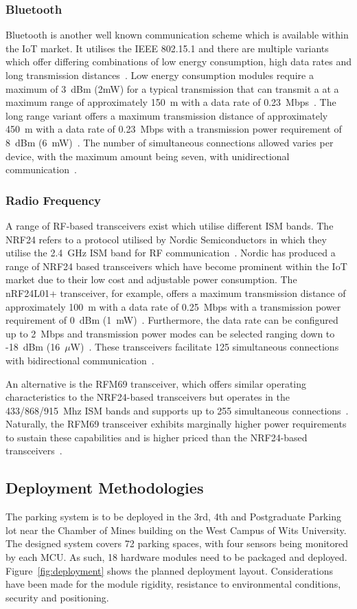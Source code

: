 \documentclass[10pt,twocolumn]{witseiepaper}
\begin{document}
		\subsubsection{Bluetooth}
			Bluetooth is another well known communication scheme which is available within the IoT market. It utilises the IEEE 802.15.1 and there are multiple variants which offer differing combinations of low energy consumption, high data rates and long transmission distances~\cite{802.15.2}. Low energy consumption modules require a maximum of 3~dBm (2mW) for a typical transmission that can transmit a at a maximum range of approximately 150~m with a data rate of 0.23~Mbps~\cite{BLE112}. The long range variant offers a maximum transmission distance of approximately 450~m with a data rate of 0.23~Mbps with a transmission power requirement of 8~dBm (6~mW)~\cite{BLE112LR}. The number of simultaneous connections allowed varies per device, with the maximum amount being seven, with unidirectional communication~\cite{bluetooth-users}.

		\subsubsection{Radio Frequency}
			A range of RF-based transceivers exist which utilise different ISM bands. The NRF24 refers to a protocol utilised by Nordic Semiconductors in which they utilise the 2.4~GHz ISM band for RF communication~\cite{nrf24}. Nordic has produced a range of NRF24 based transceivers which have become prominent within the IoT market due to their low cost and adjustable power consumption. The nRF24L01+ transceiver, for example, offers a maximum transmission distance of approximately 100~m with a data rate of 0.25~Mbps with a transmission power requirement of 0~dBm (1~mW)~\cite{nrf24}. Furthermore, the data rate can be configured up to 2~Mbps and transmission power modes can be selected ranging down to -18~dBm (16~$\mu$W)~\cite{nrf24}. These transceivers facilitate 125 simultaneous connections with bidirectional communication~\cite{nrf24}.
			
			An alternative is the RFM69 transceiver, which offers similar operating characteristics to the NRF24-based transceivers but operates in the 433/868/915~Mhz ISM bands and supports up to 255 simultaneous connections~\cite{rfm69}. Naturally, the RFM69 transceiver exhibits marginally higher power requirements to sustain these capabilities and is higher priced than the NRF24-based transceivers~\cite{rfm69}.
	
	\subsection{Deployment Methodologies}
		The parking system is to be deployed in the 3rd, 4th and Postgraduate Parking lot near the Chamber of Mines building on the West Campus of Wits University. The designed system covers 72 parking spaces, with four sensors being monitored by each MCU. As such, 18 hardware modules need to be packaged and deployed. Figure~\ref{fig:deployment} shows the planned deployment layout. Considerations have been made for the module rigidity, resistance to environmental conditions, security and positioning.
		
\end{document}
